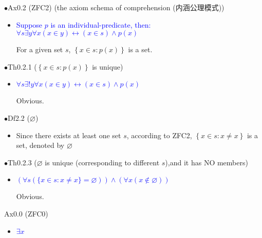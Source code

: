 \documentclass{article}
\begin{document}
{\Large $\bullet $Ax0.2 (ZFC2) (the axiom schema of comprehension (内涵公理模式))}\par
\begin{itemize}
    \item[]
    {\large \textcolor{blue}{Suppose $p$ is an individual-predicate, then:\\
        $\forall s\exists y\forall x(x\in y)\leftrightarrow(x\in s)\land p(x)$}}\par
    \textcolor{pf}{For a given set $s$, $\left \{ x\in s:p(x) \right \} $ is a set.}
\end{itemize}\par
\quad

{\Large $\bullet $Th0.2.1 ($\left \{ x\in s:p(x) \right \} $ is unique)}\par
\begin{itemize}
    \item[]
    {\large \textcolor{blue}{$\forall s\exists!y\forall x(x\in y)\leftrightarrow(x\in s)\land p(x)$}}\par
    {\textcolor{pf}{Obvious.}}
\end{itemize}\par
\quad

{\Large $\bullet $Df2.2 ($\varnothing $)}\par
\begin{itemize}
    \item[]
    {\large Since there exists at least one set $s$, according to ZFC2, 
    $\left \{ x\in s: x\neq x \right \} $ is a set, denoted by $\varnothing $}\par
\end{itemize}\par
\quad

{\Large $\bullet $Th0.2.3 ($\varnothing $ is unique (corresponding to different $s$),and it has NO members)}\par
\begin{itemize}
    \item[]
    {\large \textcolor{blue}{$(\forall s (\{x\in s:x\neq x\}=\varnothing))\wedge(\forall x(x\notin\varnothing))$}}\par
    {\textcolor{pf}{Obvious.}}
\end{itemize}\par
\quad

{\Large Ax0.0 (ZFC0)}\par
\begin{itemize}
    \item[]
    {\large \textcolor{blue}{$\exists x$}}\par
    {\textcolor{pf}{}}
\end{itemize}\par
\quad
\end{document}
